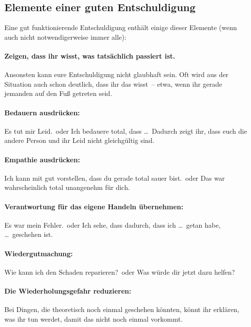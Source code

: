 \subsection{Elemente einer guten Entschuldigung}

Eine gut funktionierende Entschuldigung enthält einige dieser Elemente (wenn auch nicht notwendigerweise immer alle):

\paragraph{Zeigen, dass ihr wisst, was tatsächlich passiert ist.} Ansonsten kann eure Entschuldigung nicht glaubhaft sein. Oft wird aus der Situation auch schon deutlich, dass ihr das wisst~-- etwa, wenn ihr gerade jemanden auf den Fuß getreten seid.

\paragraph{Bedauern ausdrücken:} \glqq Es tut mir Leid.\grqq\ oder \glqq Ich bedauere total, dass \ldots\grqq\ Dadurch zeigt ihr, dass euch die andere Person und ihr Leid nicht gleichgültig sind.

\paragraph{Empathie ausdrücken:} \glqq Ich kann mit gut vorstellen, dass du gerade total sauer bist.\grqq\ oder \glqq Das war wahrscheinlich total unangenehm für dich.\grqq

\paragraph{Verantwortung für das eigene Handeln übernehmen:} \glqq Es war mein Fehler.\grqq\ oder \glqq Ich sehe, dass dadurch, dass ich \ldots\ getan habe, \ldots\ geschehen ist.\grqq

\paragraph{Wiedergutmachung:} \glqq Wie kann ich den Schaden reparieren?\grqq\ oder \glqq Was würde dir jetzt dazu helfen?\grqq

\paragraph{Die Wiederholungsgefahr reduzieren:} Bei Dingen, die theoretisch noch einmal geschehen könnten, könnt ihr erklären, was ihr tun werdet, damit das nicht noch einmal vorkommt.

